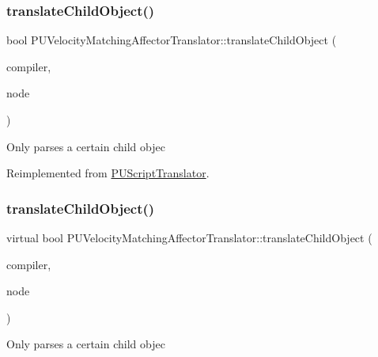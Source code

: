 \subsubsection{\texorpdfstring{translate\+Child\+Object()}{translateChildObject()}\hspace{0.1cm}{\footnotesize\ttfamily [1/2]}}
{\footnotesize\ttfamily bool P\+U\+Velocity\+Matching\+Affector\+Translator\+::translate\+Child\+Object (\begin{DoxyParamCaption}\item[{\hyperlink{classPUScriptCompiler}{P\+U\+Script\+Compiler} $\ast$}]{compiler,  }\item[{\hyperlink{classPUAbstractNode}{P\+U\+Abstract\+Node} $\ast$}]{node }\end{DoxyParamCaption})\hspace{0.3cm}{\ttfamily [virtual]}}

Only parses a certain child objec 

Reimplemented from \hyperlink{classPUScriptTranslator_ab587d01348ae3e678cb700c719b2b113}{P\+U\+Script\+Translator}.

\mbox{\label{classPUVelocityMatchingAffectorTranslator_a97a2839557f46b1734f0b5088e181159}} 
\subsubsection{\texorpdfstring{translate\+Child\+Object()}{translateChildObject()}\hspace{0.1cm}{\footnotesize\ttfamily [2/2]}}
{\footnotesize\ttfamily virtual bool P\+U\+Velocity\+Matching\+Affector\+Translator\+::translate\+Child\+Object (\begin{DoxyParamCaption}\item[{\hyperlink{classPUScriptCompiler}{P\+U\+Script\+Compiler} $\ast$}]{compiler,  }\item[{\hyperlink{classPUAbstractNode}{P\+U\+Abstract\+Node} $\ast$}]{node }\end{DoxyParamCaption})\hspace{0.3cm}{\ttfamily [virtual]}}

Only parses a certain child objec 

